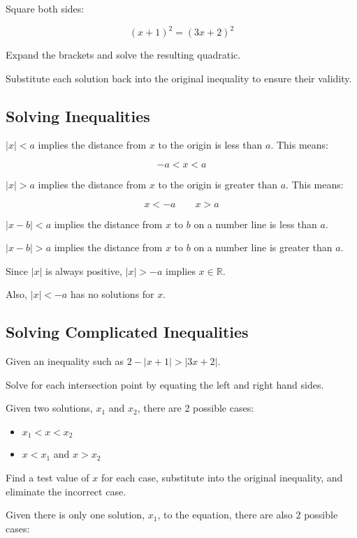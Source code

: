\documentclass[a4paper,11pt]{article}
\begin{document}
Square both sides:

$$
(x + 1)^2 = (3x + 2)^2
$$

Expand the brackets and solve the resulting quadratic.

Substitute each solution back into the original inequality to ensure their
validity.


\subsection{Solving Inequalities}

$\lvert x \rvert < a$ implies the distance from $x$ to the origin is less than
$a$. This means:

$$
-a < x < a
$$

$\lvert x \rvert > a$ implies the distance from $x$ to the origin is greater
than $a$. This means:

$$
x < -a \qquad x > a
$$

$\lvert x - b \rvert < a$ implies the distance from $x$ to $b$ on a number line
is less than $a$.

$\lvert x - b \rvert > a$ implies the distance from $x$ to $b$ on a number line
is greater than $a$.

Since $\lvert x \rvert$ is always positive, $\lvert x \rvert > -a$ implies
$x \in \mathbb{R}$.

Also, $\lvert x \rvert < -a$ has no solutions for $x$.


\subsection{Solving Complicated Inequalities}

Given an inequality such as $2 - \lvert x + 1 \rvert > \lvert 3x + 2 \rvert$.

Solve for each intersection point by equating the left and right hand sides.

Given two solutions, $x_1$ and $x_2$, there are 2 possible cases:

\begin{itemize}
\item $x_1 < x < x_2$
\item $x < x_1$ and $x > x_2$
\end{itemize}

Find a test value of $x$ for each case, substitute into the original inequality,
and eliminate the incorrect case.

Given there is only one solution, $x_1$, to the equation, there are also 2
possible cases:
\end{document}
